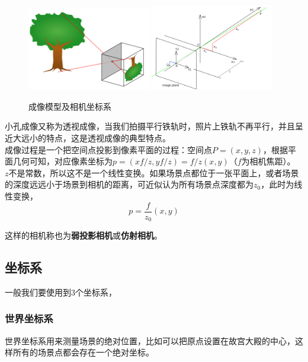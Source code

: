 \documentclass[hpyerref,UTF8,a4paper,titlepage,12pt,oneside]{ctexbook}
\theoremstyle{definition}
\begin{document}
	\begin{figure}[H]
		\begin{center}
			\includegraphics[width=0.48\textwidth]{images/pinhole.png}
			\includegraphics[width=0.48\textwidth]{images/pinhole_coor.png}
		\end{center}
		\caption{成像模型及相机坐标系}
	\end{figure}

	小孔成像又称为透视成像，当我们拍摄平行铁轨时，照片上铁轨不再平行，并且呈近大远小的特点，这是透视成像的典型特点。\\

	成像过程是一个把空间点投影到像素平面的过程：空间点$P=(x,y,z)$，根据平面几何可知，对应像素坐标为$p = (xf/z, yf/z) = f/z(x,y)$（$f$为相机焦距）。\\
	
	$z$不是常数，所以这不是一个线性变换。如果场景点都位于一张平面上，或者场景的深度远远小于场景到相机的距离，可近似认为所有场景点深度都为$z_0$，此时为线性变换，
	$$
		p = \frac{f}{z_0}(x,y)
	$$

	这样的相机称也为\textbf{弱投影相机}或\textbf{仿射相机}。

\subsection{坐标系}
	一般我们要使用到3个坐标系，

	\subsubsection*{世界坐标系}
		世界坐标系用来测量场景的绝对位置，比如可以把原点设置在故宫大殿的中心，这样所有的场景点都会存在一个绝对坐标。\\
\end{document}
